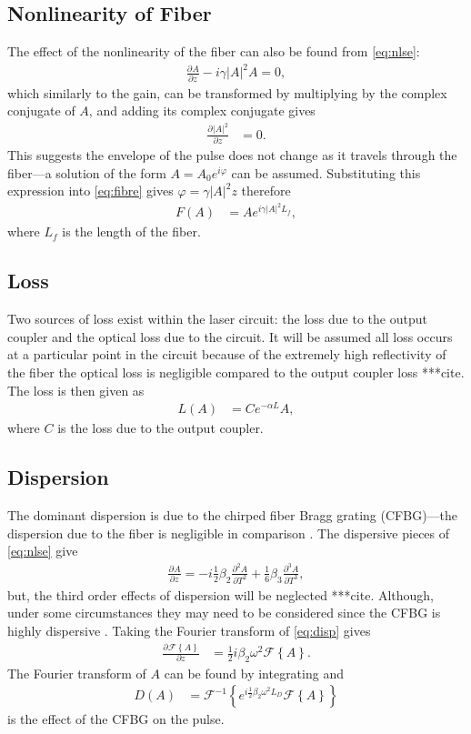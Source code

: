 \documentclass[12pt]{article}
\newcommand{\pdiff}[3][]{\frac{\partial^{#1}#2}{\partial{#3}^{#1}}}
\newcommand{\FT}[1]{\mathcal{F}\left\{ #1 \right\}}
\newcommand{\FTi}[1]{\mathcal{F}^{-1}\left\{ #1 \right\}}
\begin{document}
\subsection{Nonlinearity of Fiber}
The effect of the nonlinearity of the fiber can also be found from \eqref{eq:nlse}:
\begin{align*}
\pdiff{A}{z} - i \gamma |A|^2 A = 0,
\end{align*}
which similarly to the gain, can be transformed by multiplying by the complex conjugate of $A$, and adding its complex conjugate gives
\begin{align}
\label{eq:fibre}
\pdiff{|A|^2}{z} &= 0.
\end{align}
This suggests the envelope of the pulse does not change as it travels through the fiber---a solution of the form $A = A_0 e^{i \varphi}$ can be assumed. Substituting this expression into \eqref{eq:fibre} gives $\varphi = \gamma |A|^2 z$ therefore
\begin{align*}
F(A) &= A e^{i \gamma |A|^2 L_f},
\end{align*}
where $L_f$ is the length of the fiber.

\subsection{Loss}
Two sources of loss exist within the laser circuit: the loss due to the output coupler and the optical loss due to the circuit. It will be assumed all loss occurs at a particular point in the circuit because of the extremely high reflectivity of the fiber the optical loss is negligible compared to the output coupler loss ***cite. The loss is then given as
\begin{align*}
L(A) &= C e^{- \alpha L}A,
\end{align*}
where $C$ is the loss due to the output coupler.

\subsection{Dispersion}
The dominant dispersion is due to the chirped fiber Bragg grating (CFBG)---the dispersion due to the fiber is negligible in comparison \cite{agrawalother}. The dispersive pieces of \eqref{eq:nlse} give
\begin{align}
\label{eq:disp}
\pdiff{A}{z} = -i \frac{1}{2} \beta_2 \pdiff[2]{A}{T} + \frac{1}{6} \beta_3 \pdiff[3]{A}{T},
\end{align}
but, the third order effects of dispersion will be neglected ***cite. Although, under some circumstances they may need to be considered since the CFBG is highly dispersive \cite{litchinitser}. Taking the Fourier transform of \eqref{eq:disp} gives
\begin{align*}
\pdiff{\FT{A}}{z} &= \frac{1}{2} i \beta_2 \omega^2 \FT{A}.
\end{align*}
The Fourier transform of $A$ can be found by integrating and
\begin{align*}
D(A) &= \FTi{e^{i \frac{1}{2} \beta_2 \omega^2 L_D} \FT{A}}
\end{align*}
is the effect of the CFBG on the pulse.
\end{document}
